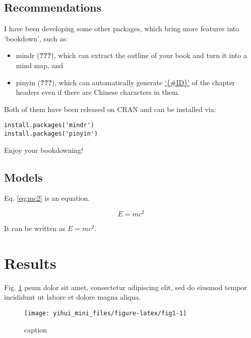\documentclass[]{article}
\begin{document}
\subsection{Recommendations}\label{recommendations}

I have been developing some other packages, which bring more features
into `bookdown', such as:

\begin{itemize}
\item
  mindr ({\textbf{???}}), which can extract the outline of your book and
  turn it into a mind map, and
\item
  pinyin ({\textbf{???}}), which can automatically generate
  \href{https://bookdown.org/yihui/bookdown/cross-references.html}{`\{\#ID\}'}
  of the chapter headers even if there are Chinese characters in them.
\end{itemize}

Both of them have been released on CRAN and can be installed via:

\begin{verbatim}
install.packages('mindr')
install.packages('pinyin')
\end{verbatim}

Enjoy your bookdowning!

\subsection{Models}\label{models}

Eq. \eqref{eq:mc2} is an equation.

\begin{equation} 
E = mc^2
  \label{eq:mc2}
\end{equation}

It can be written as \(E = mc^2\).

\section{Results}\label{results}

Fig. \ref{fig:fig1} psum dolor sit amet, consectetur adipiscing elit,
sed do eiusmod tempor incididunt ut labore et dolore magna aliqua.

\begin{figure}

{\centering \texttt{[image: yihui\_mini\_files/figure-latex/fig1-1]} 

}

\caption{caption}\label{fig:fig1}
\end{figure}
\end{document}
